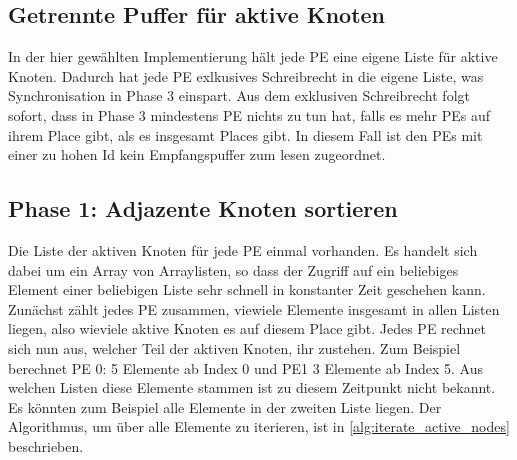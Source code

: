 \subsection{Getrennte Puffer für aktive Knoten} %
\label{sub:getrennte_puffer_f_r_aktive_knoten}
In der hier gewählten Implementierung hält jede PE eine eigene Liste für aktive Knoten. Dadurch hat jede PE exlkusives Schreibrecht in die eigene Liste, was Synchronisation in Phase 3 einspart. Aus dem exklusiven Schreibrecht folgt sofort, dass in Phase 3 mindestens PE nichts zu tun hat, falls es mehr PEs auf ihrem Place gibt, als es insgesamt Places gibt. In diesem Fall ist den PEs mit einer zu hohen Id kein Empfangspuffer zum lesen zugeordnet.

\subsection{Phase 1: Adjazente Knoten sortieren} %
\label{sub:phase_1_invasive}
Die Liste der aktiven Knoten für jede PE einmal vorhanden. Es handelt sich dabei um ein Array von Arraylisten, so dass der Zugriff auf ein beliebiges Element einer beliebigen Liste sehr schnell in konstanter Zeit geschehen kann. Zunächst zählt jedes PE zusammen, viewiele Elemente insgesamt in allen Listen liegen, also wieviele aktive Knoten es auf diesem Place gibt. Jedes PE rechnet sich nun aus, welcher Teil der aktiven Knoten, ihr zustehen. Zum Beispiel berechnet PE 0: 5 Elemente ab Index 0 und PE1 3 Elemente ab Index 5. Aus welchen Listen diese Elemente stammen ist zu diesem Zeitpunkt nicht bekannt. Es könnten zum Beispiel alle Elemente in der zweiten Liste liegen. Der Algorithmus, um über alle Elemente zu iterieren, ist in \ref{alg:iterate_active_nodes} beschrieben.

